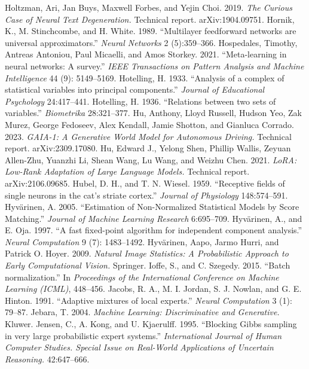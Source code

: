  Holtzman, Ari, Jan Buys, Maxwell Forbes, and Yejin Choi. 2019. \emph{The Curious Case of Neural Text Degeneration.} Technical report. arXiv:1904.09751.
 Hornik, K., M. Stinchcombe, and H. White. 1989. ``Multilayer feedforward networks are universal approximators.'' \emph{Neural Networks} 2 (5):359--366.
 Hospedales, Timothy, Antreas Antoniou, Paul Micaelli, and Amos Storkey. 2021. ``Meta-learning in neural networks: A survey.'' \emph{IEEE Transactions on Pattern Analysis and Machine Intelligence} 44 (9): 5149--5169.
 Hotelling, H. 1933. ``Analysis of a complex of statistical variables into principal components.'' \emph{Journal of Educational Psychology} 24:417--441.
 Hotelling, H. 1936. ``Relations between two sets of variables.'' \emph{Biometrika} 28:321--377.
 Hu, Anthony, Lloyd Russell, Hudson Yeo, Zak Murez, George Fedoseev, Alex Kendall, Jamie Shotton, and Gianluca Corrado. 2023. \emph{GAIA-1: A Generative World Model for Autonomous Driving.} Technical report. arXiv:2309.17080.
 Hu, Edward J., Yelong Shen, Phillip Wallis, Zeyuan Allen-Zhu, Yuanzhi Li, Shean Wang, Lu Wang, and Weizhu Chen. 2021. \emph{LoRA: Low-Rank Adaptation of Large Language Models.} Technical report. arXiv:2106.09685.
 Hubel, D. H., and T. N. Wiesel. 1959. ``Receptive fields of single neurons in the cat's striate cortex.'' \emph{Journal of Physiology} 148:574--591.
 Hyv\"arinen, A. 2005. ``Estimation of Non-Normalized Statistical Models by Score Matching.'' \emph{Journal of Machine Learning Research} 6:695--709.
 Hyv\"arinen, A., and E. Oja. 1997. ``A fast fixed-point algorithm for independent component analysis.'' \emph{Neural Computation} 9 (7): 1483--1492.
 Hyv\"arinen, Aapo, Jarmo Hurri, and Patrick O. Hoyer. 2009. \emph{Natural Image Statistics: A Probabilistic Approach to Early Computational Vision.} Springer.
 Ioffe, S., and C. Szegedy. 2015. ``Batch normalization.'' In \emph{Proceedings of the International Conference on Machine Learning (ICML)}, 448--456.
 Jacobs, R. A., M. I. Jordan, S. J. Nowlan, and G. E. Hinton. 1991. ``Adaptive mixtures of local experts.'' \emph{Neural Computation} 3 (1): 79--87.
 Jebara, T. 2004. \emph{Machine Learning: Discriminative and Generative.} Kluwer.
 Jensen, C., A. Kong, and U. Kjaerulff. 1995. ``Blocking Gibbs sampling in very large probabilistic expert systems.'' \emph{International Journal of Human Computer Studies. Special Issue on Real-World Applications of Uncertain Reasoning.} 42:647--666.
